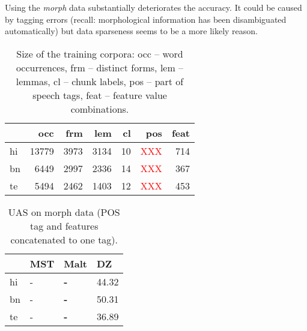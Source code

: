 \documentclass[11pt]{article}
\newcommand{\XXX}{\textcolor{red}{XXX }} %
\begin{document}
Using the \textit{morph} data substantially deteriorates the accuracy. It could be caused by tagging errors (recall: morphological information has been disambiguated automatically) but data sparseness seems to be a more likely reason.

\begin{table}[ht]
\begin{centering}
\begin{tabular}{l|r|r|r|r|r|r}
& \textbf{occ} & \textbf{frm} & \textbf{lem} & \textbf{cl} & \textbf{pos} & \textbf{feat} \\
\hline
hi & 13779 & 3973 & 3134 & 10 & \XXX & 714\\
bn & 6449 & 2997 & 2336 & 14 & \XXX & 367\\
te & 5494 & 2462 & 1403 & 12 & \XXX & 453\\
\end{tabular}
\caption{Size of the training corpora: occ -- word occurrences, frm -- distinct forms, lem -- lemmas, cl -- chunk labels, pos -- part of speech tags, feat -- feature value combinations.}
\label{tab:corpus}
\end{centering}
\end{table}


\begin{table}[ht]
\begin{centering}
\begin{tabular}{l|l|l|l}
& \textbf{MST} & \textbf{Malt} & \textbf{DZ} \\
\hline
hi & - & \textbf{-} & 44.32\\
bn & - & \textbf{-} & 50.31\\
te & - & \textbf{-} & 36.89\\
\end{tabular}
\caption{UAS on morph data (POS tag and features concatenated to one tag).}
\label{tab:poscasevib}
\end{centering}
\end{table}
\end{document}
